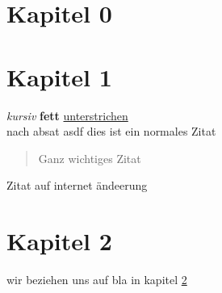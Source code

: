 \chapter{Kapitel 0}

\chapter{Kapitel 1}
\label{kapt1}

\textit{kursiv}
\textbf{fett}
\underline{unterstrichen}\\
nach absat
asdf
\titel
dies ist ein normales Zitat\cite{Autor.1992}
\begin{quote}
	Ganz wichtiges Zitat\cite{Abc.2018}
\end{quote}
Zitat auf internet\cite{internet}
ändeerung

\chapter{Kapitel 2}

wir beziehen uns auf bla in kapitel \ref{kapt1}